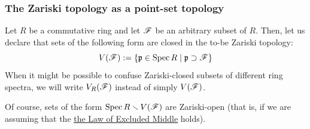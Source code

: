         \subsubsection{The Zariski topology as a point-set topology} 
            \begin{definition} \label{def: zariski_closed}
                Let $R$ be a commutative ring and let $\mathscr{F}$ be an arbitrary subset of $R$. Then, let us declare that sets of the following form are closed in the to-be Zariski topology:
                    $$V(\mathscr{F}) := \left\{\mathfrak{p} \in \operatorname{Spec} R \mid \mathfrak{p} \supset \mathscr{F} \right\}$$
                When it might be possible to confuse Zariski-closed subsets of different ring spectra, we will write $V_R(\mathscr{F})$ instead of simply $V(\mathscr{F})$.
            \end{definition}
            \begin{remark}
                Of course, sets of the form $\operatorname{Spec} R \smallsetminus V(\mathscr{F})$ are Zariski-open (that is, if we are assuming that the \href{https://ncatlab.org/nlab/show/excluded+middle}{\underline{the Law of Excluded Middle}} holds).
            \end{remark}
            
